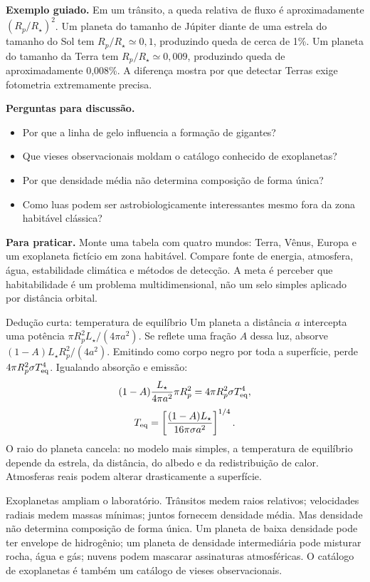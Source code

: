 \documentclass[11pt,a4paper]{article}
\begin{document}
\textbf{Exemplo guiado.} Em um trânsito, a queda relativa de fluxo é aproximadamente $(R_p/R_\star)^2$. Um planeta do tamanho de Júpiter diante de uma estrela do tamanho do Sol tem $R_p/R_\star\simeq0{,}1$, produzindo queda de cerca de 1\%. Um planeta do tamanho da Terra tem $R_p/R_\star\simeq0{,}009$, produzindo queda de aproximadamente 0,008\%. A diferença mostra por que detectar Terras exige fotometria extremamente precisa.

\textbf{Perguntas para discussão.}
\begin{itemize}
\item Por que a linha de gelo influencia a formação de gigantes?
\item Que vieses observacionais moldam o catálogo conhecido de exoplanetas?
\item Por que densidade média não determina composição de forma única?
\item Como luas podem ser astrobiologicamente interessantes mesmo fora da zona habitável clássica?
\end{itemize}

\textbf{Para praticar.} Monte uma tabela com quatro mundos: Terra, Vênus, Europa e um exoplaneta fictício em zona habitável. Compare fonte de energia, atmosfera, água, estabilidade climática e métodos de detecção. A meta é perceber que habitabilidade é um problema multidimensional, não um selo simples aplicado por distância orbital.

\begin{lessonblock}[borderline west={2pt}{0pt}{astroGold}]{Dedução curta: temperatura de equilíbrio}
Um planeta a distância $a$ intercepta uma potência $\pi R_p^2 L_\star/(4\pi a^2)$. Se reflete uma fração $A$ dessa luz, absorve $(1-A)L_\star R_p^2/(4a^2)$. Emitindo como corpo negro por toda a superfície, perde $4\pi R_p^2\sigma T_{\rm eq}^4$. Igualando absorção e emissão:
\[
(1-A)\frac{L_\star}{4\pi a^2}\pi R_p^2=4\pi R_p^2\sigma T_{\rm eq}^4,
\]
\[
T_{\rm eq}=\left[\frac{(1-A)L_\star}{16\pi\sigma a^2}\right]^{1/4}.
\]
O raio do planeta cancela: no modelo mais simples, a temperatura de equilíbrio depende da estrela, da distância, do albedo e da redistribuição de calor. Atmosferas reais podem alterar drasticamente a superfície.
\end{lessonblock}

Exoplanetas ampliam o laboratório. Trânsitos medem raios relativos; velocidades radiais medem massas mínimas; juntos fornecem densidade média. Mas densidade não determina composição de forma única. Um planeta de baixa densidade pode ter envelope de hidrogênio; um planeta de densidade intermediária pode misturar rocha, água e gás; nuvens podem mascarar assinaturas atmosféricas. O catálogo de exoplanetas é também um catálogo de vieses observacionais.
\end{document}
